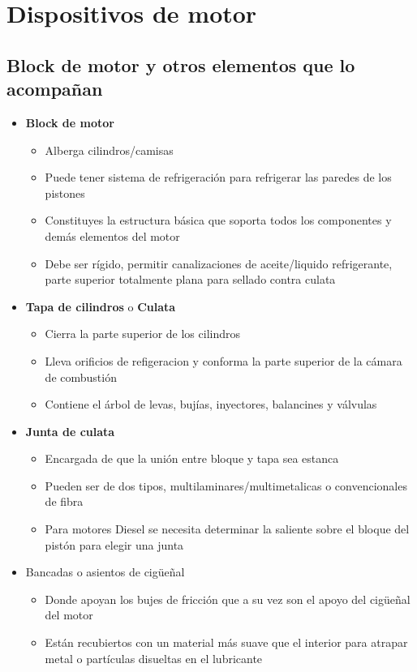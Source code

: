 \section{Dispositivos de motor}
\subsection{Block de motor y otros elementos que lo acompañan}
\begin{itemize}
\item \textbf{Block de motor}
\begin{itemize}
\item Alberga cilindros/camisas
\item Puede tener sistema de refrigeración para refrigerar las paredes de los pistones 
\item Constituyes la estructura básica que soporta todos los componentes y demás elementos del motor
\item Debe ser rígido, permitir canalizaciones de aceite/liquido refrigerante,  parte superior totalmente plana para sellado contra culata
\end{itemize}
\item \textbf{Tapa de cilindros} o \textbf{Culata}
\begin{itemize}
\item Cierra la parte superior de los cilindros
\item Lleva orificios de refigeracion y conforma la parte superior de la cámara de combustión
\item Contiene el árbol de levas, bujías, inyectores, balancines y válvulas
\end{itemize}
\item \textbf{Junta de culata}
\begin{itemize}
\item Encargada de que la unión entre bloque y tapa sea estanca
\item Pueden ser de dos tipos, multilaminares/multimetalicas o convencionales de fibra
\item Para motores Diesel se necesita determinar la saliente sobre el bloque del pistón para elegir una junta
\end{itemize}
\item Bancadas o asientos de cigüeñal
\begin{itemize}
\item Donde apoyan los bujes de fricción que a su vez son el apoyo del cigüeñal del motor
\item Están recubiertos con un material más suave que el interior para atrapar metal o partículas disueltas en el lubricante

\end{itemize}
\end{itemize}
